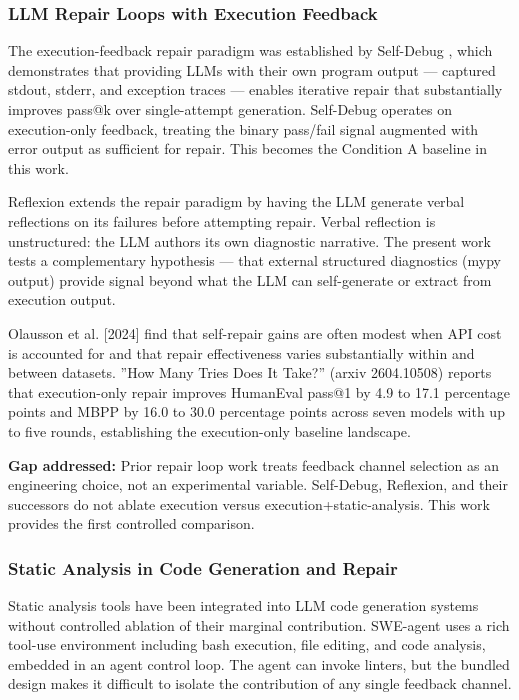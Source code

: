 
\subsubsection{LLM Repair Loops with Execution Feedback}

The execution-feedback repair paradigm was established by Self-Debug \citep{Chen2023Teaching}, which demonstrates that providing LLMs with their own program output --- captured stdout, stderr, and exception traces --- enables iterative repair that substantially improves pass@k over single-attempt generation. Self-Debug operates on execution-only feedback, treating the binary pass/fail signal augmented with error output as sufficient for repair. This becomes the Condition A baseline in this work.

Reflexion \citep{Shinn2023Reflexion} extends the repair paradigm by having the LLM generate verbal reflections on its failures before attempting repair. Verbal reflection is unstructured: the LLM authors its own diagnostic narrative. The present work tests a complementary hypothesis --- that external structured diagnostics (mypy output) provide signal beyond what the LLM can self-generate or extract from execution output.

Olausson et al. [2024] find that self-repair gains are often modest when API cost is accounted for and that repair effectiveness varies substantially within and between datasets. ''How Many Tries Does It Take?'' (arxiv 2604.10508) reports that execution-only repair improves HumanEval pass@1 by 4.9 to 17.1 percentage points and MBPP by 16.0 to 30.0 percentage points across seven models with up to five rounds, establishing the execution-only baseline landscape.

\textbf{Gap addressed:} Prior repair loop work treats feedback channel selection as an engineering choice, not an experimental variable. Self-Debug, Reflexion, and their successors do not ablate execution versus execution+static-analysis. This work provides the first controlled comparison.

\subsubsection{Static Analysis in Code Generation and Repair}

Static analysis tools have been integrated into LLM code generation systems without controlled ablation of their marginal contribution. SWE-agent \citep{Yang2024SWEagent} uses a rich tool-use environment including bash execution, file editing, and code analysis, embedded in an agent control loop. The agent can invoke linters, but the bundled design makes it difficult to isolate the contribution of any single feedback channel.

